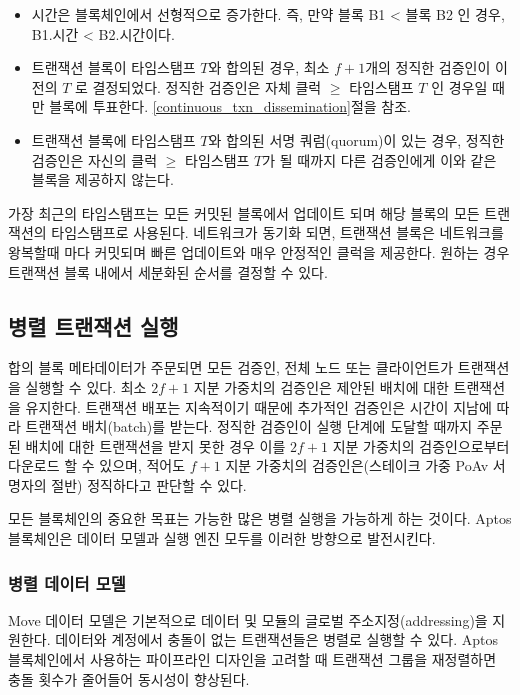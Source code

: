 \documentclass{article}
\begin{document}
\begin{itemize}
\item 시간은 블록체인에서 선형적으로 증가한다. 즉, 만약 블록 B1 < 블록 B2 인 경우, B1.시간 < B2.시간이다.

\item 트랜잭션 블록이 타임스탬프 $T$와 합의된 경우, 최소 $f + 1$개의 정직한 검증인이 이전의 $T$ 로 결정되었다. 정직한 검증인은 자체 클럭 $\geq$ 타임스탬프 $T$ 인 경우일 때만 블록에 투표한다. \ref{continuous_txn_dissemination}절을 참조.

\item 트랜잭션 블록에 타임스탬프 $T$와 합의된 서명 쿼럼(quorum)이 있는 경우, 정직한 검증인은 자신의 클럭 $\geq$ 타임스탬프 $T$가 될 때까지 다른 검증인에게 이와 같은 블록을 제공하지 않는다.
\end{itemize}

가장 최근의 타임스탬프는 모든 커밋된 블록에서 업데이트 되며 해당 블록의 모든 트랜잭션의 타임스탬프로 사용된다. 네트워크가 동기화 되면, 트랜잭션 블록은 네트워크를 왕복할때 마다 커밋되며 빠른 업데이트와 매우 안정적인 클럭을 제공한다. 원하는 경우 트랜잭션 블록 내에서 세분화된 순서를 결정할 수 있다.

\subsection{병렬 트랜잭션 실행}
\label{subsec:parallel_transaction_execution}

합의 블록 메타데이터가 주문되면 모든 검증인, 전체 노드 또는 클라이언트가 트랜잭션을 실행할 수 있다. 최소 $2f + 1$ 지분 가중치의 검증인은 제안된 배치에 대한 트랜잭션을 유지한다. 트랜잭션 배포는 지속적이기 때문에 추가적인 검증인은 시간이 지남에 따라 트랜잭션 배치(batch)를 받는다. 정직한 검증인이 실행 단계에 도달할 때까지 주문된 배치에 대한 트랜잭션을 받지 못한 경우 이를 $2f + 1$ 지분 가중치의 검증인으로부터 다운로드 할 수 있으며, 적어도 $f + 1$ 지분 가중치의 검증인은(스테이크 가중 PoAv 서명자의 절반) 정직하다고 판단할 수 있다.

모든 블록체인의 중요한 목표는 가능한 많은 병렬 실행을 가능하게 하는 것이다. Aptos 블록체인은 데이터 모델과 실행 엔진 모두를 이러한 방향으로 발전시킨다.

\subsubsection{병렬 데이터 모델}

Move 데이터 모델은 기본적으로 데이터 및 모듈의 글로벌 주소지정(addressing)을 지원한다. 데이터와 계정에서 충돌이 없는 트랜잭션들은 병렬로 실행할 수 있다. Aptos 블록체인에서 사용하는 파이프라인 디자인을 고려할 때 트랜잭션 그룹을 재정렬하면 충돌 횟수가 줄어들어 동시성이 향상된다.
\end{document}
